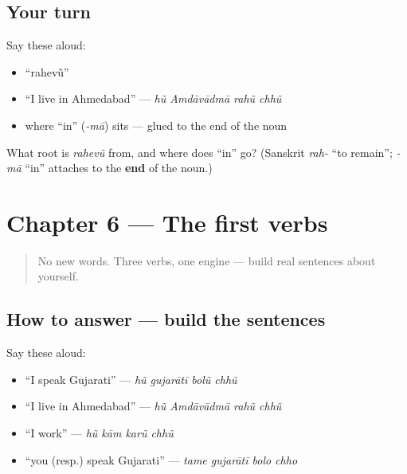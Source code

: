 \subsection*{Your turn}
Say these aloud:

\begin{itemize}
\raggedright
  \item \textquotedblleft{}rahevũ\textquotedblright{}
  \item \textquotedblleft{}I live in Ahmedabad\textquotedblright{} — \emph{hũ Amdāvādmā rahũ chhũ}
  \item where \textquotedblleft{}in\textquotedblright{} (\emph{-mā}) sits — glued to the end of the noun
\end{itemize}

\begin{tcolorbox}[breakable,colback=teal!4,colframe=teal!35!black,title={Before you move on}]
What root is \emph{rahevũ} from, and where does \textquotedblleft{}in\textquotedblright{} go? (Sanskrit \emph{rah-} \textquotedblleft{}to remain\textquotedblright{}; \emph{-mā} \textquotedblleft{}in\textquotedblright{} attaches to the \textbf{end} of the noun.)
\end{tcolorbox}
\section[Practice]{Chapter 6 — The first verbs}

\label{lesson:GU-C05-practice}



\begin{quote}
No new words. Three verbs, one engine — build real sentences about yourself.
\end{quote}

\subsection*{How to answer — build the sentences}
Say these aloud:

\begin{itemize}
\raggedright
  \item \textquotedblleft{}I speak Gujarati\textquotedblright{} — \emph{hũ gujarātī bolũ chhũ}
  \item \textquotedblleft{}I live in Ahmedabad\textquotedblright{} — \emph{hũ Amdāvādmā rahũ chhũ}
  \item \textquotedblleft{}I work\textquotedblright{} — \emph{hũ kām karũ chhũ}
  \item \textquotedblleft{}you (resp.) speak Gujarati\textquotedblright{} — \emph{tame gujarātī bolo chho}
\end{itemize}

